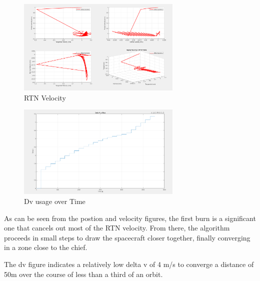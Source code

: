 \begin{figure}[H]
    \centering
    \includegraphics[width=0.7\textwidth]{PS5/Figures/velocity.png}
    \caption{RTN Velocity}
    \label{fig:hcw_velocity}
\end{figure}

\begin{figure}[H]
    \centering
    \includegraphics[width=0.7\textwidth]{PS5/Figures/dv.png}
    \caption{Dv usage over Time}
    \label{fig:hcw_velocity}
\end{figure}

As can be seen from the postion and velocity figures, the first burn is a significant one that cancels out most of the RTN velocity. From there, the algorithm proceeds in small steps to draw the spacecraft closer together, finally converging in a zone close to the chief.

The dv figure indicates a relatively low delta v of 4 m/s to converge a distance of 50m over the course of less than a third of an orbit.

